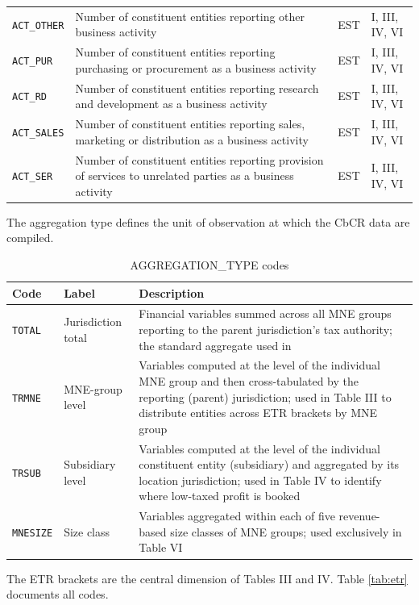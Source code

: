 \documentclass[11pt,a4paper]{article}
\newcommand{\code}[1]{\texttt{#1}}
\begin{document}
\begin{longtable}{@{}lp{6cm}lp{2.5cm}@{}}
\code{ACT\_OTHER} & Number of constituent entities reporting other business activity & EST & I, III, IV, VI \\
\code{ACT\_PUR}  & Number of constituent entities reporting purchasing or procurement as a business activity & EST & I, III, IV, VI \\
\code{ACT\_RD}  & Number of constituent entities reporting research and development as a business activity & EST & I, III, IV, VI \\
\code{ACT\_SALES} & Number of constituent entities reporting sales, marketing or distribution as a business activity & EST & I, III, IV, VI \\
\code{ACT\_SER}  & Number of constituent entities reporting provision of services to unrelated parties as a business activity & EST & I, III, IV, VI \\
\end{longtable}

The aggregation type defines the unit of observation at which the CbCR data are compiled. 

\begin{table}[H]
\centering
\caption{AGGREGATION\_TYPE codes}
\label{tab:aggtypes}
\begin{tabular}{@{}llp{8cm}@{}}
\toprule
Code & Label & Description \\
\midrule
\code{TOTAL} & Jurisdiction total & Financial variables summed across all MNE groups reporting to the parent jurisdiction's tax authority; the standard aggregate used in \citet{barake2022} \\
\code{TRMNE} & MNE-group level & Variables computed at the level of the individual MNE group and then cross-tabulated by the reporting (parent) jurisdiction; used in Table III to distribute entities across ETR brackets by MNE group \\
\code{TRSUB} & Subsidiary level & Variables computed at the level of the individual constituent entity (subsidiary) and aggregated by its location jurisdiction; used in Table IV to identify where low-taxed profit is booked \\
\code{MNESIZE} & Size class & Variables aggregated within each of five revenue-based size classes of MNE groups; used exclusively in Table VI \\
\bottomrule
\end{tabular}
\end{table}


The ETR brackets are the central dimension of Tables III and IV. Table \ref{tab:etr} documents all codes. 
\end{document}
